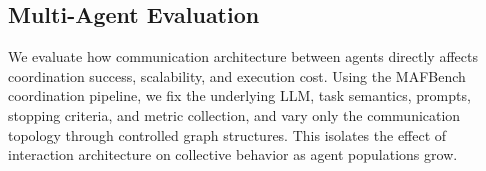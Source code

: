 






\vspace{-3mm}
\subsection{Multi-Agent Evaluation}

We evaluate how communication architecture between agents directly affects coordination success, scalability, and execution cost. Using the MAFBench coordination pipeline, we fix the underlying LLM, task semantics, prompts, stopping criteria, and metric collection, and vary only the communication topology through controlled graph structures. This isolates the effect of interaction architecture on collective behavior as agent populations grow.






